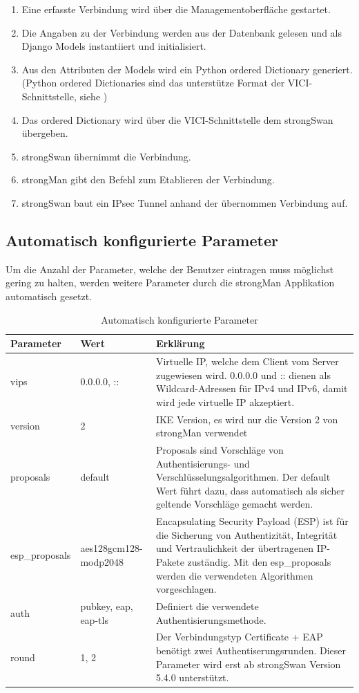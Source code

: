 \begin{enumerate}
    \item Eine erfasste Verbindung wird über die Managementoberfläche gestartet.
    \item Die Angaben zu der Verbindung werden aus der Datenbank gelesen und als Django Models instantiiert und initialisiert.
    \item Aus den Attributen der Models wird ein Python ordered Dictionary generiert. (Python ordered Dictionaries sind das unterstütze Format der VICI-Schnittstelle, siehe \pageref{orderedDictionary})
    \item Das ordered Dictionary wird über   die VICI-Schnittstelle dem strongSwan übergeben. 
    \item strongSwan übernimmt die Verbindung.
    \item strongMan gibt den Befehl zum Etablieren der Verbindung.
    \item strongSwan baut ein IPsec Tunnel anhand der übernommen Verbindung auf.
\end{enumerate}
\newpage


\subsection{Automatisch konfigurierte Parameter}
Um die Anzahl der Parameter, welche der Benutzer eintragen muss möglichst gering zu halten, werden weitere Parameter durch die strongMan Applikation automatisch gesetzt. \\
\begin{table}[H]
\centering
    \begin{tabular}{|p{}|p{}|p{}|}
    \hline
    \rowcolor{lightblue}
    Parameter & Wert & Erklärung \\ \hline
	vips	&	0.0.0.0,  :: & Virtuelle IP, welche dem Client vom Server zugewiesen wird. 0.0.0.0 und :: dienen als Wildcard-Adressen für IPv4 und IPv6, damit wird jede virtuelle IP akzeptiert.	\\ \hline
	version & 2 & IKE Version, es wird nur die Version 2 von strongMan verwendet \\ \hline
	proposals & default & Proposals sind Vorschläge von Authentisierungs- und Verschlüsselungsalgorithmen. Der default Wert führt dazu, dass automatisch als sicher geltende Vorschläge gemacht werden.\\ \hline
	esp\_proposals & aes128gcm128-modp2048 & Encapsulating Security Payload (ESP) ist für die Sicherung von Authentizität, Integrität und Vertraulichkeit der übertragenen IP-Pakete zuständig. Mit den esp\_proposals werden die verwendeten Algorithmen vorgeschlagen. \\ \hline
	auth & pubkey, eap, eap-tls & Definiert die verwendete Authentisierungsmethode. \\ \hline
	round & 1, 2 &  Der Verbindungstyp Certificate + EAP benötigt zwei Authentiserungsrunden. Dieser Parameter wird erst ab strongSwan Version 5.4.0 unterstützt. \\ \hline
	\end{tabular}
    \caption[Automatisch konfigurierte Parameter]{Automatisch konfigurierte Parameter}
\end{table}\medskip

